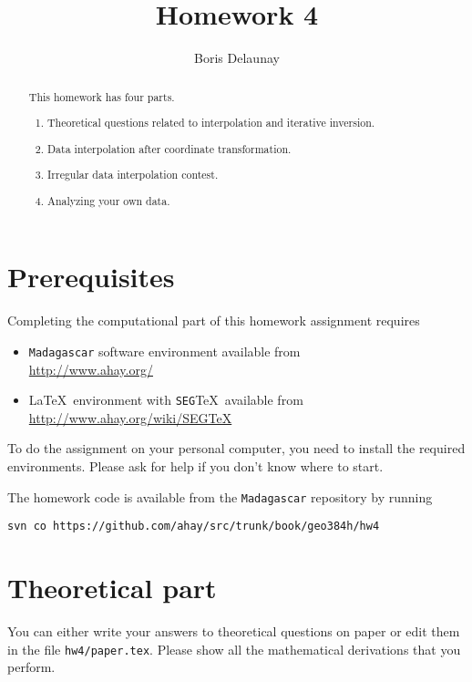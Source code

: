 \author{Boris Delaunay}
\title{Homework 4}

\begin{abstract}
  This homework has four parts. 
  \begin{enumerate}
  \item Theoretical questions related to interpolation and iterative inversion.
  \item Data interpolation after coordinate transformation.
  \item Irregular data interpolation contest.
  \item Analyzing your own data.
  \end{enumerate}
\end{abstract}

\section{Prerequisites}

Completing the computational part of this homework assignment requires
\begin{itemize}
\item \texttt{Madagascar} software environment available from \\
\url{http://www.ahay.org/}
\item \LaTeX\ environment with \texttt{SEG}\TeX\ available from \\ 
\url{http://www.ahay.org/wiki/SEGTeX}
\end{itemize}
To do the assignment on your personal computer, you need to install
the required environments. Please ask for help if you don't know where
to start.

The homework code is available from the \texttt{Madagascar} repository
by running
\begin{verbatim}
svn co https://github.com/ahay/src/trunk/book/geo384h/hw4
\end{verbatim}

\section{Theoretical part}

You can either write your answers to theoretical questions on paper or
edit them in the file \texttt{hw4/paper.tex}. Please show all the
mathematical derivations that you perform.

